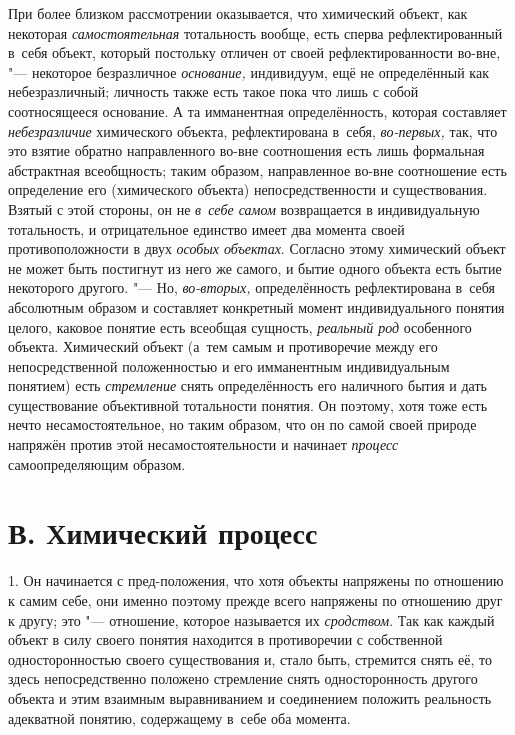 При более близком рассмотрении оказывается, что химический
объект, как некоторая
{\em самостоятельная}
тотальность вообще, есть сперва рефлектированный в~себя
объект, который постольку отличен от своей рефлектированности во-вне, "---
некоторое безразличное
{\em основание,}
индивидуум, ещё не определённый как небезразличный; личность
также есть такое пока что лишь с собой соотносящееся
основание.
А та имманентная определённость, которая составляет
{\em небезразличие}
химического объекта, рефлектирована в~себя,
{\em во-первых,} так, что
это взятие обратно направленного во-вне соотношения есть лишь формальная
абстрактная всеобщность; таким образом, направленное во-вне соотношение
есть определение его (химического объекта) непосредственности и
существования. Взятый с этой стороны, он не
{\em в~себе самом}
возвращается в индивидуальную тотальность, и отрицательное
единство имеет два момента своей противоположности в двух
{\em особых объектах}.
Согласно этому химический объект не может быть постигнут из
него же самого, и бытие одного объекта есть бытие некоторого другого. "---
Но, {\em во-вторых,}
определённость рефлектирована в~себя абсолютным образом и
составляет конкретный момент индивидуального понятия целого, каковое
понятие есть всеобщая сущность,
{\em реальный род}
особенного объекта. Химический объект (а~тем самым и
противоречие между его непосредственной положенностью и его имманентным
индивидуальным понятием) есть
{\em стремление} снять
определённость его наличного бытия и дать существование объективной
тотальности понятия. Он поэтому, хотя тоже есть нечто несамостоятельное, но
таким образом, что он по самой своей природе напряжён против этой
несамостоятельности и начинает
{\em процесс}
самоопределяющим образом.

\section[В. Химический процесс]{В. Химический процесс}

1. Он начинается с пред-положения, что хотя объекты напряжены
по отношению к самим себе, они именно поэтому прежде всего напряжены по
отношению друг к другу; это "--- отношение, которое называется
их {\em сродством}. Так
как каждый объект в силу своего понятия находится в противоречии с
собственной односторонностью своего существования и, стало быть, стремится
снять её, то здесь непосредственно положено стремление снять
односторонность другого объекта и этим взаимным выравниванием и соединением
положить реальность адекватной понятию, содержащему в~себе оба момента.

